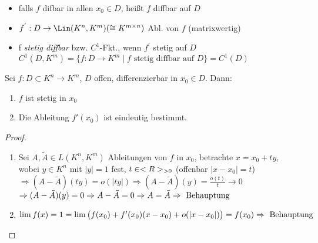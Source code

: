 \begin{definition}
	\begin{itemize}
		\item falls $f$ difbar in allen $x_0 \in D$, heißt $f$ diffbar auf $D$
		\item $f^{'}: D \to \Lin(K^n, K^m) (\cong K^{m\times n})$ Abl. von $f$ (matrixwertig)
		\item f \emph{stetig diffbar} bzw. $C^1$-Fkt., wenn $f^{'}$ stetig auf $D$\\
		$C^1(D,K^m) = \{f: D \to K^m \mid f \text{ stetig diffbar auf } D\} = C^1(D)$
	\end{itemize}
\end{definition}


\begin{proposition}
	Sei $f:D\subset K^n \to K^m$, $D$ offen, differenzierbar in $x_0\in D$. Dann:
	\begin{enumerate}[label={\arabic*)}]
		\item $f$ ist stetig in $x_0$
		\item Die Ableitung $f'(x_0)$ ist eindeutig bestimmt.
	\end{enumerate}
\end{proposition}

\begin{proof}
	\begin{enumerate}
		\item Sei $A,\tilde{A}\in L(K^n,K^m)$ Ableitungen von $f$ in $x_0$, betrachte $x=x_0+ty$, wobei $y\in K^n$ mit $\vert y\vert =1$ fest, $t\in<R>_{>0}$ (offenbar $\vert x-x_0\vert=t$) \\
		$\Rightarrow (A-\tilde{A})(ty)=o(\vert ty\vert)\Rightarrow (A-\tilde{A})(y)=\frac{o(t)}{t}\to 0$ \\
		$\Rightarrow (A-\tilde{A})(y)=0\Rightarrow A-\tilde{A}=0\Rightarrow A=\tilde{A}\Rightarrow \text{ Behauptung}$
		\item $\lim f(x)=1=\lim\big(f(x_0)+f'(x_0)(x-x_0)+o(\vert x-x_0\vert)\big)=f(x_0)\Rightarrow \text{ Behauptung}$
	\end{enumerate}
\end{proof}

